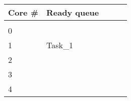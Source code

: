 \documentclass{article}
\begin{document}
\begin{figure}
\begin{minipage}{1.0\linewidth}
\begin{tabular}{l | l l l l}
Core \# & Ready queue\\
\hline
&\\
0 & & & &\\
1 & Task\_1 & & &\\
2 & & & &\\
3 & & & &\\
4 & & & &\\
\end{tabular}
\end{minipage}


\begin{minipage}{1.0\linewidth}
\begin{verbatim}










\end{verbatim}
\end{minipage}

\end{figure}
\end{document}
